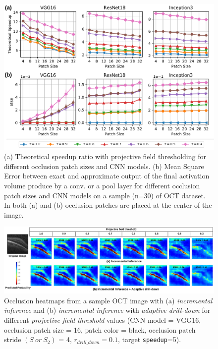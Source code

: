 \begin{figure}[t]
\includegraphics[width=\columnwidth]{images/proj_thresholding}
\caption{(a) Theoretical speedup ratio with projective field thresholding for different occlusion patch sizes and CNN models. (b) Mean Square Error between exact and approximate output of the final activation volume produce by a conv. or a pool layer for different occlusion patch sizes and CNN models on a sample (n=30) of OCT dataset. In both (a) and (b) occlusion patches are placed at the center of the image.}
\label{fig:th_redundancy_ratio}
\end{figure}

\begin{figure}[t]
\includegraphics[width=\textwidth]{images/visual_examples_1}
\caption{Occlusion heatmaps from a sample OCT image with (a) \textit{incremental inference} and (b) \textit{incremental inference} with \textit{adaptive drill-down} for different \textit{projective field threshold} values (CNN model = VGG16, occlusion patch size = 16, patch color = black, occlusion patch stride $(S~or~S_2)$ = 4, $r_{drill\_down}=0.1$, target \texttt{speedup}=5).}
\label{fig:visual_examples_1}
\end{figure}


